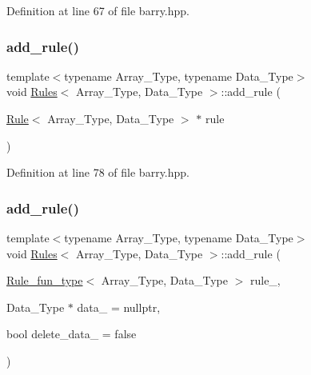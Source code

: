 Definition at line 67 of file barry.\+hpp.

\mbox{\label{classbarry_1_1_rules_abd60b1d381ad0c8a772e4d81264bbe0a}} 
\subsubsection{\texorpdfstring{add\+\_\+rule()}{add\_rule()}\hspace{0.1cm}{\footnotesize\ttfamily [2/3]}}
{\footnotesize\ttfamily template$<$typename Array\+\_\+\+Type, typename Data\+\_\+\+Type$>$ \\
void \hyperlink{classbarry_1_1_rules}{Rules}$<$ Array\+\_\+\+Type, Data\+\_\+\+Type $>$\+::add\+\_\+rule (\begin{DoxyParamCaption}\item[{\hyperlink{classbarry_1_1_rule}{Rule}$<$ Array\+\_\+\+Type, Data\+\_\+\+Type $>$ $\ast$}]{rule }\end{DoxyParamCaption})\hspace{0.3cm}{\ttfamily [inline]}}



Definition at line 78 of file barry.\+hpp.

\mbox{\label{classbarry_1_1_rules_abbc63747014445b538384bb500464bb5}} 
\subsubsection{\texorpdfstring{add\+\_\+rule()}{add\_rule()}\hspace{0.1cm}{\footnotesize\ttfamily [3/3]}}
{\footnotesize\ttfamily template$<$typename Array\+\_\+\+Type, typename Data\+\_\+\+Type$>$ \\
void \hyperlink{classbarry_1_1_rules}{Rules}$<$ Array\+\_\+\+Type, Data\+\_\+\+Type $>$\+::add\+\_\+rule (\begin{DoxyParamCaption}\item[{\hyperlink{namespacebarry_aefd7e6d4ba228e2ce1074d075c512178}{Rule\+\_\+fun\+\_\+type}$<$ Array\+\_\+\+Type, Data\+\_\+\+Type $>$}]{rule\+\_\+,  }\item[{Data\+\_\+\+Type $\ast$}]{data\+\_\+ = {\ttfamily nullptr},  }\item[{bool}]{delete\+\_\+data\+\_\+ = {\ttfamily false} }\end{DoxyParamCaption})\hspace{0.3cm}{\ttfamily [inline]}}



